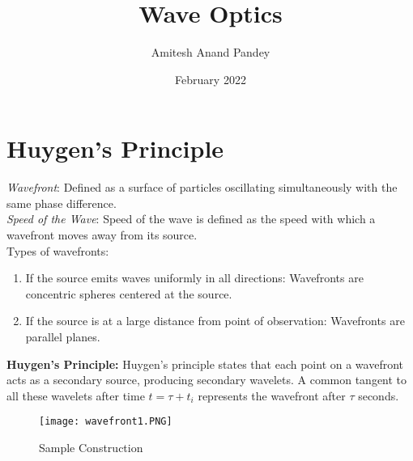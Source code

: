 \documentclass{article}
\title{Wave Optics}
\author{Amitesh Anand Pandey}
\date{February 2022}
\begin{document}
\maketitle
\section{Huygen's Principle}
\emph{Wavefront}: Defined as a surface of particles oscillating simultaneously with the same phase difference.\newline \\
\emph{Speed of the Wave}: Speed of the wave is defined as the speed with which a wavefront moves away from its source.\newline \\
Types of wavefronts:
\begin{enumerate}
    \item If the source emits waves uniformly in all directions: Wavefronts are concentric spheres centered at the source. 
    \item If the source is at a large distance from point of observation: Wavefronts are parallel planes.
\end{enumerate}
\textbf{Huygen's Principle: } Huygen's principle states that each point on a wavefront acts as a secondary source, producing secondary wavelets. A common tangent to all these wavelets after time $t = \tau + t_i$ represents the wavefront after $\tau$ seconds. 
\begin{figure}[htp]
    \centering
    \texttt{[image: wavefront1.PNG]}
    \caption{Sample Construction}
    \label{fig:galaxy}
\end{figure}
\newpage
\end{document}
